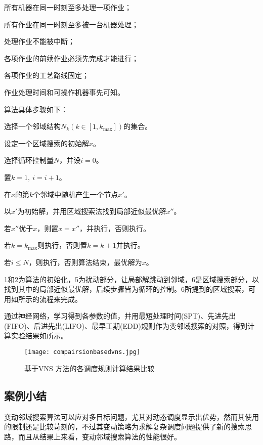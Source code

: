 \begin{asparaitem}
\item 所有机器在同一时刻至多处理一项作业；
\item 所有作业在同一时刻至多被一台机器处理；
\item 处理作业不能被中断；
\item 各项作业的前续作业必须先完成才能进行；
\item 各项作业的工艺路线固定；
\item 作业处理时间和可操作机器事先可知。
\end{asparaitem}
算法具体步骤如下：
\begin{asparaenum}
\renewcommand{\labelenumi}{\heiti 步骤\theenumi~}
\item 选择一个邻域结构$N_k(k\in [1,k_{\max}])$的集合。
\item 设定一个区域搜索的初始解$x$。
\item 选择循环控制量$N$，并设$i=0$。
\item 置$k = 1,\ i = i+1$。
\item 在$x$的第$k$个邻域中随机产生一个节点$x'$。
\item 以$x'$为初始解，并用区域搜索法找到局部近似最优解$x''$。
\item 若$x''$优于$x$，则置$x = x''$，并执行，否则执行。
\item 若$k = k_{\max}$则执行，否则置$k = k+1$并执行。
\item 若$i\leqslant N$，则执行，否则算法结束，最优解为$x$。
\end{asparaenum}

\Step1和\Step2为算法的初始化，\Step5为扰动部分，让局部解跳动到邻域，\Step6是区域搜索部分，以找到其中的局部近似最优解，后续步骤皆为循环的控制。\Step6所提到的区域搜索，可用如所示的流程来完成。

通过神经网络，学习得到各参数的值，并用最短处理时间(SPT)、先进先出(FIFO)、后进先出(LIFO)、最早工期(EDD)规则作为变邻域搜索的对照，得到计算实验结果如所示。
\begin{figure}[h]
\centering
\texttt{[image: compairsionbasedvns.jpg]}
\caption{基于VNS 方法的各调度规则计算结果比较\label{fig:vnscompare}}
\end{figure}
\subsection{案例小结}
变动邻域搜索算法可以应对多目标问题，尤其对动态调度显示出优势，然而其使用的限制还是比较苛刻的，不过其变动策略为求解复杂调度问题提供了新的搜索思路，而且从结果上来看，变动邻域搜索算法的性能很好。